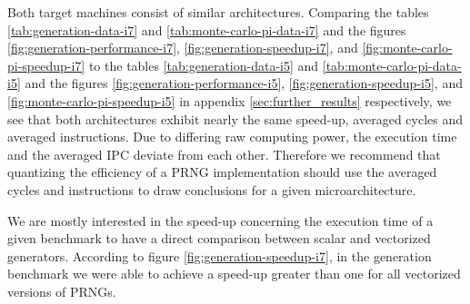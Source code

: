 \documentclass{stdlocal}
\begin{document}
    Both target machines consist of similar architectures.
    Comparing the tables \ref{tab:generation-data-i7} and \ref{tab:monte-carlo-pi-data-i7} and the figures \ref{fig:generation-performance-i7}, \ref{fig:generation-speedup-i7}, and \ref{fig:monte-carlo-pi-speedup-i7} to the tables \ref{tab:generation-data-i5} and \ref{tab:monte-carlo-pi-data-i5} and the figures \ref{fig:generation-performance-i5}, \ref{fig:generation-speedup-i5}, and \ref{fig:monte-carlo-pi-speedup-i5} in appendix \ref{sec:further_results} respectively, we see that both architectures exhibit nearly the same speed-up, averaged cycles and averaged instructions.
    Due to differing raw computing power, the execution time and the averaged IPC deviate from each other.
    Therefore we recommend that quantizing the efficiency of a PRNG implementation should use the averaged cycles and instructions to draw conclusions for a given microarchitecture.

    We are mostly interested in the speed-up concerning the execution time of a given benchmark to have a direct comparison between scalar and vectorized generators.
    According to figure \ref{fig:generation-speedup-i7}, in the generation benchmark we were able to achieve a speed-up greater than one for all vectorized versions of PRNGs.
\end{document}
